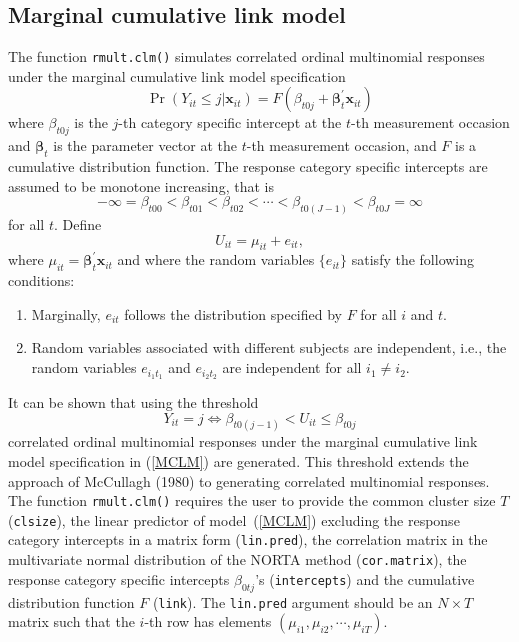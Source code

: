 \documentclass{article}
\begin{document}
\subsection{Marginal cumulative link model}
The function \texttt{rmult.clm()} simulates correlated ordinal multinomial responses under the marginal cumulative link model specification
\begin{equation}
\Pr(Y_{it}\le j |\mathbf {x}_{it})=F(\beta_{t0j} +\boldsymbol {\beta}^{\prime}_t \mathbf {x}_{it})
\label{MCLM}
\end{equation}
where $\beta_{t0j}$ is the $j$-th category specific intercept at the $t$-th measurement occasion and $\boldsymbol \beta_t$ is the parameter vector at the $t$-th measurement occasion, and $F$ is a cumulative distribution function. The response category specific intercepts are assumed to be monotone increasing, that is
$$-\infty=\beta_{t00} <\beta_{t01} < \beta_{t02} < \cdots < \beta_{t0(J-1)}< \beta_{t0J}=\infty$$
for all $t$. Define
$$U_{it}=\mu_{it}+e_{it},$$
where $\mu_{it}=\boldsymbol{\beta}^{\prime}_t \mathbf {x}_{it}$ and where the random variables $\{e_{it}\}$ satisfy the following conditions:
\begin{enumerate}
\item Marginally, $e_{it}$ follows the distribution specified by $F$ for all $i$ and $t$.
\item Random variables associated with different subjects are independent, i.e., the random variables $e_{i_1t_1}$ and $e_{i_2t_2}$ are independent for all $i_1 \neq i_2$.
\end{enumerate}
It can be shown that using the threshold
$$Y_{it}=j \Leftrightarrow \beta_{t0(j-1)} < U_{it} \leq \beta_{t0j}$$
correlated ordinal multinomial responses under the marginal cumulative link model specification in (\ref{MCLM}) are generated. This threshold extends the approach of McCullagh (1980) to generating correlated multinomial responses.\\
\indent The function \texttt{rmult.clm()} requires the user to provide the common cluster size $T$ (\texttt{clsize}), the linear predictor of model~(\ref{MCLM}) excluding the response category intercepts in a matrix form (\texttt{lin.pred}), the correlation matrix in the multivariate normal distribution of the NORTA method (\texttt{cor.matrix}), the response category specific intercepts $\beta_{0tj}$'s (\texttt{intercepts}) and the cumulative distribution function $F$ (\texttt{link}). The \texttt{lin.pred} argument should be an $N \times T$ matrix such that the $i$-th row has elements $(\mu_{i1},\mu_{i2},\cdots,\mu_{iT})$.\\
\end{document}
